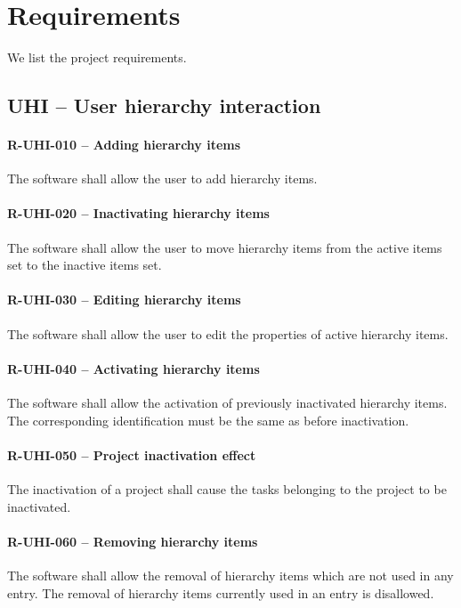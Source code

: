 \section{Requirements}
We list the project requirements.

\subsection{UHI -- User hierarchy interaction}
\paragraph{R-UHI-010 -- Adding hierarchy items}
The software shall allow the user to add hierarchy items.

\paragraph{R-UHI-020 -- Inactivating hierarchy items}
The software shall allow the user to move hierarchy items
from the active items set to the inactive items set.

\paragraph{R-UHI-030 -- Editing hierarchy items}
The software shall allow the user to edit the properties of
active hierarchy items.

\paragraph{R-UHI-040 -- Activating hierarchy items}
The software shall allow the activation of previously inactivated hierarchy
items. The corresponding identification must be the same as before
inactivation.

\paragraph{R-UHI-050 -- Project inactivation effect}
The inactivation of a project shall cause the tasks belonging to the project to
be inactivated.

\paragraph{R-UHI-060 -- Removing hierarchy items}
The software shall allow the removal of hierarchy items which are
not used in any entry. The removal of hierarchy items currently
used in an entry is disallowed.

